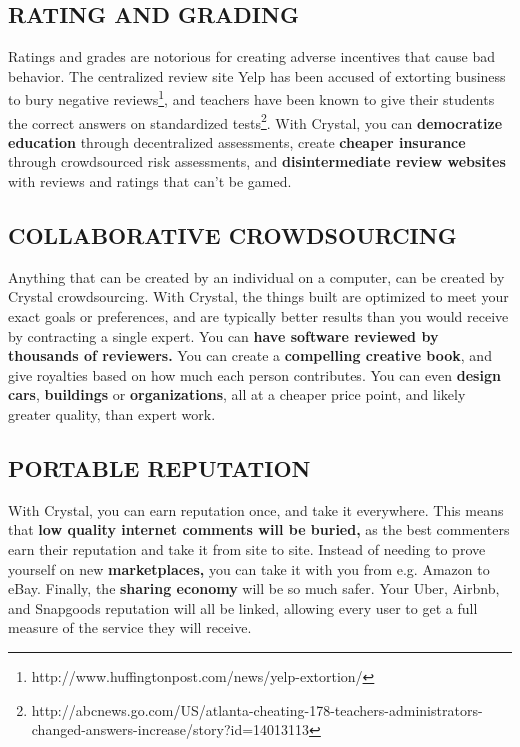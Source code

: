 \subsection{\texorpdfstring{\protect\hypertarget{_w8u1x1q8emux}{}{\protect\hypertarget{_Toc462050433}{}{}}RATING
AND GRADING}{RATING AND GRADING}}\label{rating-and-grading}

Ratings and grades are notorious for creating adverse incentives that
cause bad behavior. The centralized review site Yelp has been accused of
extorting business to bury negative reviews\footnote{http://www.huffingtonpost.com/news/yelp-extortion/},
and teachers have been known to give their students the correct answers
on standardized tests\footnote{http://abcnews.go.com/US/atlanta-cheating-178-teachers-administrators-changed-answers-increase/story?id=14013113}.
With Crystal, you can \textbf{democratize education} through
decentralized assessments, create \textbf{cheaper insurance} through
crowdsourced risk assessments, and \textbf{disintermediate review
websites} with reviews and ratings that can't be gamed.

\subsection{\texorpdfstring{\protect\hypertarget{_h2pprzhwlpy8}{}{\protect\hypertarget{_Toc462050434}{}{}}COLLABORATIVE
CROWDSOURCING}{COLLABORATIVE CROWDSOURCING}}\label{collaborative-crowdsourcing}

Anything that can be created by an individual on a computer, can be
created by Crystal crowdsourcing. With Crystal, the things built are
optimized to meet your exact goals or preferences, and are typically
better results than you would receive by contracting a single expert.
You can \textbf{have software reviewed by thousands of reviewers.} You
can create a \textbf{compelling creative book}, and give royalties based
on how much each person contributes. You can even \textbf{design}
\textbf{cars}, \textbf{buildings} or \textbf{organizations}, all at a
cheaper price point, and likely greater quality, than expert work.

\subsection{\texorpdfstring{\protect\hypertarget{_ax6ils45jeyy}{}{\protect\hypertarget{_Toc462050435}{}{}}PORTABLE
REPUTATION}{PORTABLE REPUTATION}}\label{portable-reputation}

With Crystal, you can earn reputation once, and take it everywhere. This
means that \textbf{low quality internet comments will be buried,} as the
best commenters earn their reputation and take it from site to site.
Instead of needing to prove yourself on new \textbf{marketplaces,} you
can take it with you from e.g. Amazon to eBay. Finally, the
\textbf{sharing economy} will be so much safer. Your Uber, Airbnb, and
Snapgoods reputation will all be linked, allowing every user to get a
full measure of the service they will receive.

